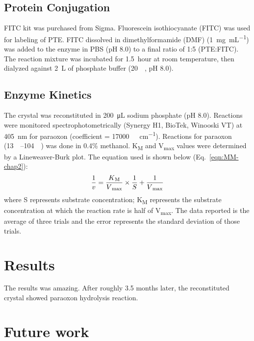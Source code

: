 \begin{refsection}
\subsection{Protein Conjugation}

FITC kit was purchased from Sigma. Fluorescein isothiocyanate (FITC) was used
for labeling of PTE. FITC dissolved in dimethylformamide (DMF)
(\SI{1}{\mg\per\mL}) was added to the enzyme in PBS (pH 8.0) to a final ratio
of 1:5 (PTE:FITC). The reaction mixture was incubated for \SI{1.5}{hour} at room
temperature, then dialyzed against \SI{2}{\liter} of phosphate buffer
(\SI{20}{\milli\Molar}, pH 8.0). 

\subsection{Enzyme Kinetics}

The crystal was reconstituted in \SI{200}{\micro\liter} sodium phosphate (pH
8.0). Reactions were monitored spectrophotometrically (Synergy H1, BioTek,
Winooski VT) at \SI{405}{\nm} for paraoxon (coefficient =
\SI{17000}{\per\Molar\per\cm}).  Reactions for paraoxon
(\SIrange{13}{104}{\micro\Molar}) was done in 0.4\% methanol.
K\textsubscript{M} and V\textsubscript{max} values were determined by a
Lineweaver-Burk plot.\cite{Baker2011b} The equation used is shown below
(Eq.~\ref{eqn:MM-chap2}): 
\begin{equation} 
    \frac{1}{v} =
    \frac{K\textsubscript{M}}{V\textsubscript{max}}\times\frac{1}{S} +
    \frac{1}{V\textsubscript{max}} 
    \label{eqn:MM-chap3}
\end{equation}
where S represents substrate concentration; K\textsubscript{M} represents the
substrate concentration at which the reaction rate is half of
V\textsubscript{max}. The data reported is the average of three trials and the
error represents the standard deviation of those trials.

\section{Results}

The results was amazing. After roughly 3.5 months later, the reconstituted
crystal showed paraoxon hydrolysis reaction. 

\section{Future work}

\printbibliography[heading=subbibliography]

\end{refsection}
